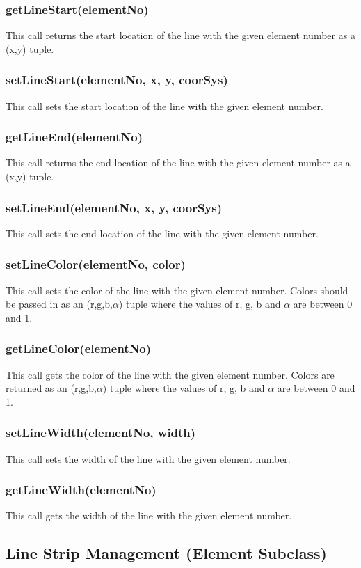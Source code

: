 \documentclass{acm_proc_article-sp}
\begin{document}
\subsubsection{getLineStart(elementNo)}
This call returns the start location of the line with the given element number as a (x,y) tuple.
\subsubsection{setLineStart(elementNo, x, y, coorSys)}
This call sets the start location of the line with the given element number.
\subsubsection{getLineEnd(elementNo)}
This call returns the end location of the line with the given element number as a (x,y) tuple.
\subsubsection{setLineEnd(elementNo, x, y, coorSys)}
This call sets the end location of the line with the given element number.
\subsubsection{setLineColor(elementNo, color)}
This call sets the color of the line with the given element number. Colors should be passed in as an (r,g,b,$\alpha$) tuple where the values of r, g, b and $\alpha$ are between 0 and 1.
\subsubsection{getLineColor(elementNo)}
This call gets the color of the line with the given element number. Colors are returned as an (r,g,b,$\alpha$) tuple where the values of r, g, b and $\alpha$ are between 0 and 1.
\subsubsection{setLineWidth(elementNo, width)}
This call sets the width of the line with the given element number.
\subsubsection{getLineWidth(elementNo)}
This call gets the width of the line with the given element number.
\subsection{Line Strip Management (Element Subclass)}
\end{document}
